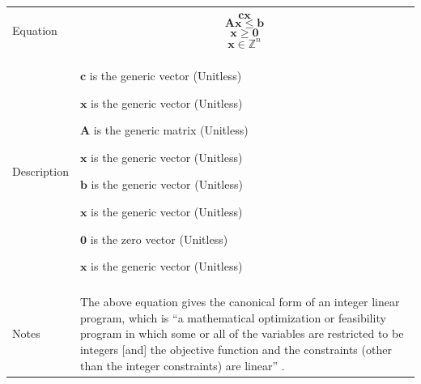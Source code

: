 \documentclass[12pt]{article}
\begin{document}
\begin{minipage}{\textwidth}
\begin{tabular}{>{\raggedright}p{}>{\raggedright\arraybackslash}p{}}
\\ \midrule \\
Equation & \begin{displaymath}
           \symbf{c} \symbf{x}
           \end{displaymath}
           \begin{displaymath}
           \symbf{A} \symbf{x}\leq{}\symbf{b}
           \end{displaymath}
           \begin{displaymath}
           \symbf{x}\geq{}\symbf{0}
           \end{displaymath}
           \begin{displaymath}
           \symbf{x}\in{}\mathbb{Z}^{n}
           \end{displaymath}
\\ \midrule \\
Description & \begin{symbDescription}
              \item{$\symbf{c}$ is the generic vector (Unitless)}
              \item{$\symbf{x}$ is the generic vector (Unitless)}
              \end{symbDescription}
              \begin{symbDescription}
              \item{$\symbf{A}$ is the generic matrix (Unitless)}
              \item{$\symbf{x}$ is the generic vector (Unitless)}
              \item{$\symbf{b}$ is the generic vector (Unitless)}
              \end{symbDescription}
              \begin{symbDescription}
              \item{$\symbf{x}$ is the generic vector (Unitless)}
              \item{$\symbf{0}$ is the zero vector (Unitless)}
              \end{symbDescription}
              \begin{symbDescription}
              \item{$\symbf{x}$ is the generic vector (Unitless)}
              \end{symbDescription}
\\ \midrule \\
Notes & The above equation gives the canonical form of an integer linear program, which is ``a mathematical optimization or feasibility program in which some or all of the variables are restricted to be integers [and] the objective function and the constraints (other than the integer constraints) are linear'' \cite{ilpWiki}.
        

\end{tabular}
\end{minipage}
\end{document}
